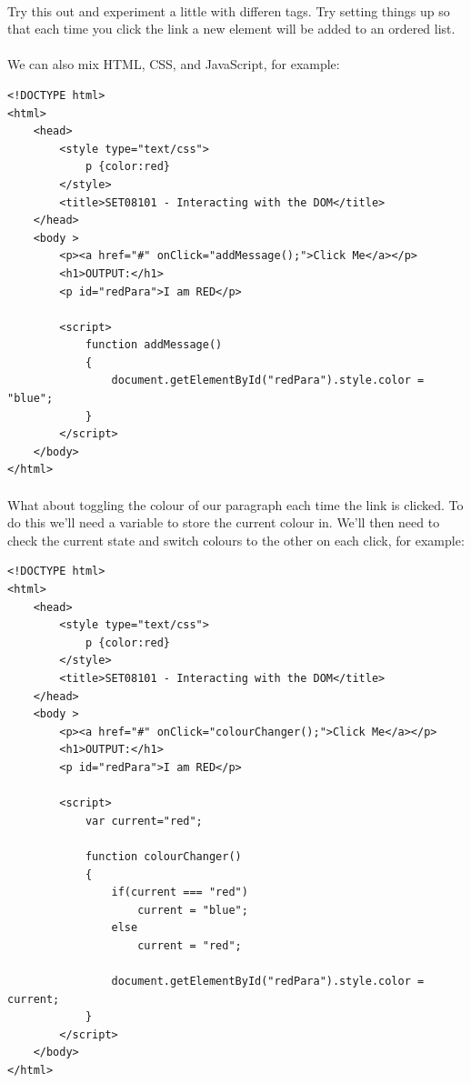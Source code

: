 \documentclass[10pt, a4paper, twosize]{article}
\begin{document}
\paragraph{} Try this out and experiment a little with differen tags. Try setting things up so that each time you click the link a new element will be added to an ordered list.

\paragraph{} We can also mix HTML, CSS, and JavaScript, for example:

\begin{lstlisting}
<!DOCTYPE html>
<html>
    <head>
        <style type="text/css">
            p {color:red}
        </style>
        <title>SET08101 - Interacting with the DOM</title>
    </head>
    <body >
        <p><a href="#" onClick="addMessage();">Click Me</a></p>
        <h1>OUTPUT:</h1>
        <p id="redPara">I am RED</p>

        <script>
            function addMessage() 
            { 
                document.getElementById("redPara").style.color = "blue";
            }      
        </script>
    </body>
</html>
\end{lstlisting}

\paragraph{} What about toggling the colour of our paragraph each time the link is clicked. To do this we'll need a variable to store the current colour in. We'll then need to check the current state and switch colours to the other on each click, for example:

\begin{lstlisting}
<!DOCTYPE html>
<html>
    <head>
        <style type="text/css">
            p {color:red}
        </style>
        <title>SET08101 - Interacting with the DOM</title>
    </head>
    <body >
        <p><a href="#" onClick="colourChanger();">Click Me</a></p>
        <h1>OUTPUT:</h1>
        <p id="redPara">I am RED</p>

        <script>
            var current="red";
            
            function colourChanger() 
            { 
                if(current === "red")
                    current = "blue";
                else
                    current = "red";

                document.getElementById("redPara").style.color = current;
            }      
        </script>
    </body>
</html>
\end{lstlisting}
\end{document}
